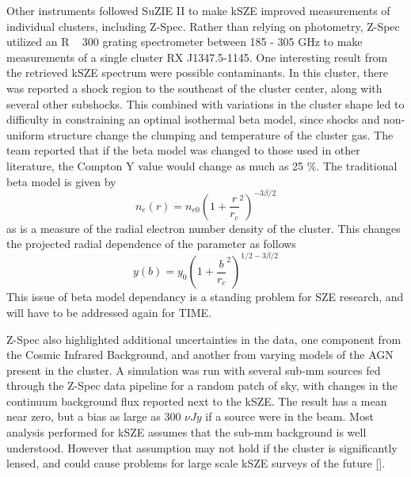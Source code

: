\documentclass[manuscript]{aastex}
\begin{document}
Other instruments followed SuZIE II to make kSZE improved measurements of individual clusters, including Z-Spec. Rather than relying on photometry, Z-Spec utilized an R ~ 300 grating spectrometer between 185 - 305 GHz to make measurements of a single cluster RX J1347.5-1145. One interesting result from the retrieved kSZE spectrum were possible contaminants. In this cluster, there was reported a shock region to the southeast of the cluster center, along with several other subshocks. This combined with variations in the cluster shape led to difficulty in constraining an optimal isothermal beta model, since shocks and non-uniform structure change the clumping and temperature of the cluster gas. The team reported that if the beta model was changed to those used in other literature, the Compton Y value would change as much as 25 \%. The traditional beta model is given by 
\begin{equation}
    n_{e}(r) = n_{e0}(1 + \frac{r}{r_{c}}^{2})^{-3\beta/2}
\end{equation}
as is a measure of the radial electron number density of the cluster. This changes the projected radial dependence of the parameter as follows
\begin{equation}
    y(b) = y_{0}(1 + \frac{b}{r_{c}}^{2})^{1/2 - 3\beta/2}
\end{equation}
This issue of beta model dependancy is a standing problem for SZE research, and will have to be addressed again for TIME.

Z-Spec also highlighted additional uncertainties in the data, one component from the Cosmic Infrared Background, and another from varying models of the AGN present in the cluster. A simulation was run with several sub-mm sources fed through the Z-Spec data pipeline for a random patch of sky, with changes in the continuum background flux reported next to the kSZE. The result has a mean near zero, but a bias as large as 300 $\nu Jy$ if a source were in the beam. Most analysis performed for kSZE assumes that the sub-mm background is well understood. However that assumption may not hold if the cluster is significantly lensed, and could cause problems for large scale kSZE surveys of the future [\cite{Zemcov2012}].
\end{document}
